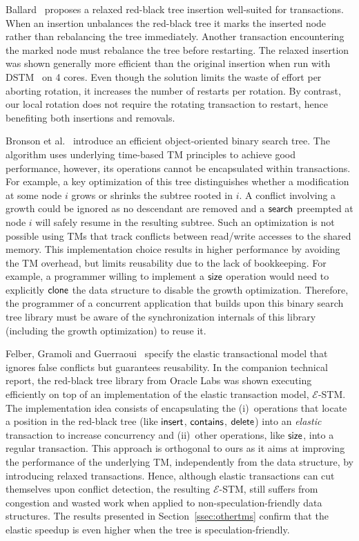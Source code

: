 Ballard~\cite{Bal06} proposes a relaxed red-black tree insertion well-suited for transactions.
When an insertion unbalances the red-black tree it marks the inserted node rather than rebalancing the tree immediately. 
Another transaction encountering the marked node must rebalance the tree before restarting.
The relaxed insertion was shown generally more efficient than the original insertion 
when run with DSTM~\cite{HLMS03} on 4 cores. Even though the solution limits the waste of effort per aborting rotation, it increases the number of restarts per rotation.
By contrast, our local rotation does not require the rotating transaction to restart, hence benefiting both insertions and removals.

Bronson et al.~\cite{BCCO10} introduce an efficient object-oriented binary search tree. The algorithm uses underlying time-based TM principles to achieve good performance, 
however, its operations cannot be encapsulated within transactions. For example, a key optimization of this tree distinguishes
whether a modification at some node $i$ grows or shrinks the subtree rooted in $i$. A conflict involving a growth could be ignored as no descendant are removed
and a $\lit{search}$ preempted at node $i$ will safely resume in the resulting subtree.
Such an optimization is not possible using TMs that track conflicts between read/write accesses to the shared memory.
This implementation choice results in higher performance by avoiding the TM overhead, but limits reusability due to the lack of bookkeeping.
%
For example, a programmer willing to implement a $\lit{size}$ operation would need to explicitly $\lit{clone}$ the data structure to disable the growth optimization.
Therefore, the programmer of a concurrent application that builds upon this binary search tree library must be aware of the synchronization internals of this library 
(including the growth optimization) to reuse it.

Felber, Gramoli and Guerraoui~\cite{FGG09} specify the elastic transactional model that ignores false conflicts but guarantees reusability. 
In the companion technical report, 
the red-black tree library from Oracle Labs was shown executing efficiently on top of an implementation 
of the elastic transaction model, ${\mathcal E}$-STM. The implementation idea
consists of encapsulating the (i)~operations that locate a position in the red-black tree (like $\lit{insert}$, $\lit{contains}$, $\lit{delete}$) 
into an \emph{elastic} transaction to increase concurrency and (ii)~other operations, like $\lit{size}$, into a regular transaction.
This approach is orthogonal to ours as it aims at improving the performance of the underlying TM, independently from the data structure, by introducing relaxed transactions.
Hence, although elastic transactions can cut themselves upon conflict detection, the resulting ${\mathcal E}$-STM, still suffers from congestion and wasted work when applied to 
non-speculation-friendly data structures. The results presented in Section~\ref{ssec:othertms} confirm that the elastic speedup is even higher when the tree is speculation-friendly.

